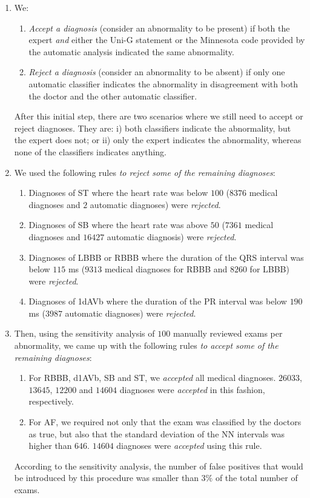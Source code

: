 \documentclass{article}
\begin{document}
\begin{enumerate}
\item We:
\begin{enumerate}
    \item \textit{Accept a diagnosis} (consider an abnormality to be present) if both the expert \emph{and} either the Uni-G statement or the Minnesota code provided by the automatic analysis indicated the same abnormality. 
    \item \textit{Reject a diagnosis} (consider an abnormality to be absent) if only one automatic classifier indicates the abnormality in disagreement with both the doctor and the other automatic classifier. 
\end{enumerate}
After this initial step, there are two scenarios where we still need to accept or reject diagnoses. They are: 
i) both classifiers indicate the abnormality, but the expert does not; or 
ii) only the expert indicates the abnormality, whereas none of the classifiers indicates anything.

\item We used the following rules \textit{to reject some of the remaining diagnoses}:

\begin{enumerate}

    \item Diagnoses of ST where the heart rate was below $100$ ($8376$ medical diagnoses and $2$ automatic diagnoses)  were \textit{rejected}. 
    \item Diagnoses of SB where the heart rate was above $50$ ($7361$ medical diagnoses and $16427$ automatic diagnosis) were \textit{rejected}. 
    \item Diagnoses of LBBB or RBBB where the duration of the QRS interval was below $115$ ms ($9313$ medical diagnoses for RBBB and $8260$ for LBBB)  were \textit{rejected}. 
    \item Diagnoses of 1dAVb where the duration of the PR interval was below $190$ ms ($3987$ automatic diagnoses) were \textit{rejected}.
\end{enumerate}

\item Then, using the sensitivity analysis of $100$ manually reviewed exams per abnormality, we came up with the following rules \textit{to accept some of the remaining diagnoses}:
\begin{enumerate}
    \item For RBBB, d1AVb, SB and ST, we \textit{accepted} all medical diagnoses. $26033$, $13645$, $12200$ and $14604$ diagnoses were \textit{accepted} in this fashion, respectively.
    \item For AF, we required not only that the exam was classified by the doctors as true, but also that the standard deviation of the NN intervals was higher than $646$. $14604$ diagnoses were \textit{accepted} using this rule.
\end{enumerate}
According to the sensitivity analysis,  the number of false positives that would be introduced  by this procedure was smaller than $3\%$ of the total number of exams.


\end{enumerate}
\end{document}
